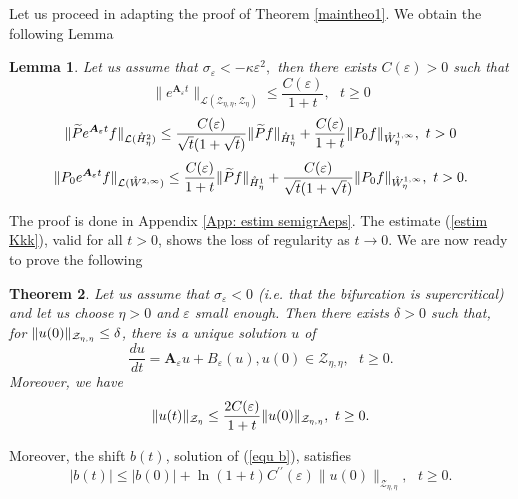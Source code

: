\documentclass[11pt]{article}
\newtheorem{theorem}{Theorem}
\newtheorem{lemma}[theorem]{Lemma}
\begin{document}
Let us proceed in adapting the proof of Theorem \ref{maintheo1}.
We obtain the following Lemma

\begin{lemma}
\label{lem:estimexp A Qtilde}Let us assume that $\sigma _{\varepsilon
}<-\kappa \varepsilon ^{2},$ then there exists $C(\varepsilon )>0$ such that%
\begin{equation}
\|e^{\boldsymbol{A}_{\varepsilon }t}\|_{\mathcal{L}(\mathcal{Z}%
_{\eta,\eta},\mathcal{Z}_{\eta})}\leq \frac{C(\varepsilon )}{1+t},\text{ }t\geq 0  \label{estim Zkka}
\end{equation}%
\begin{equation}
\|\widetilde{P}e^{\boldsymbol{A}_{\varepsilon }t}f\|_{\mathcal{L}(\mathring{H%
}_{\eta}^{2})} \leq \frac{C(\varepsilon )}{\sqrt{t}
(1 + \sqrt{t})}\|\widetilde{P}f\|_{%
\mathring{H}_{\eta}^{1}}+\frac{C(\varepsilon )}{1+t}\|P_{0}f\|_{%
\mathring{W}_{\eta}^{1,\infty }},\text{ }t>0  \label{estim Kkk} 
\end{equation}
$$
\|P_{0}e^{\boldsymbol{A}_{\varepsilon }t}f\|_{\mathcal{L}(\mathring{W}%
^{2,\infty })} \leq \frac{C(\varepsilon )}{1+t}\|\widetilde{P}f\|_{%
\mathring{H}_{\eta}^{1}}+\frac{C(\varepsilon )}{\sqrt{t}(1 + \sqrt{t})}\|P_{0}f\|_{\mathring{W%
}_{\eta}^{1,\infty }},\text{ }t>0.  \notag
$$
\end{lemma}
The proof is done in Appendix %
\ref{App: estim semigrAeps}. The estimate (\ref{estim Kkk}), valid for all $%
t>0$, shows the loss of regularity as $t\rightarrow 0.$ We are now ready to
prove the following

\begin{theorem} \label{maintheo3}
Let us assume that $\sigma _{\varepsilon }<0$ (i.e.  that 
the bifurcation is supercritical) and let us choose $\eta>0$ and $\varepsilon $ small
enough. Then there exists $\delta >0$ such that, for $\|u(0)\|_{%
\mathcal{Z}_{\eta,\eta}}\leq \delta$, there is a unique solution $u$ of 
\begin{equation}
\frac{du}{dt}=\boldsymbol{A}_{\varepsilon }u+B_{\varepsilon }(u),u(0)\in 
\mathcal{Z}_{\eta,\eta},\text{ }t\geq 0  \label{equ nonlin stab}.
\end{equation}%
Moreover, we have 
\begin{equation*}
\|u(t)\|_{\mathcal{Z}_{\eta}}\leq \frac{2C(\varepsilon )}{1+t}\|u(0)\|_{%
\mathcal{Z}_{\eta,\eta}},\text{ }t\geq 0.
\end{equation*}
\end{theorem}

Moreover, the shift $b(t)$, solution of (\ref{equ b}), satisfies
\begin{equation*}
|b(t)|\leq |b(0)|+ \ln(1 + t) C^{\prime \prime }(\varepsilon)\|u(0)\|_{\mathcal{Z}_{\eta,\eta}},\text{ }t\geq 0.
\end{equation*}
\end{document}
